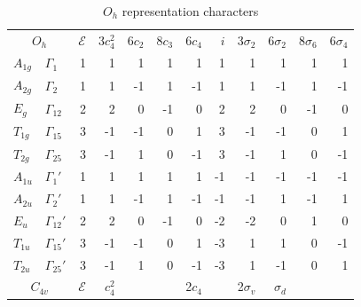 \documentclass[twocolumn,showpacs,preprintnumbers,superscriptaddress,prb,floatfix,aps,10pt]{revtex4-1}
\newcommand*{\id}{\mathcal{E}}
\begin{document}
%
%
%

\begin{table}
\caption{\label{table:chartab} $O_h$ representation characters}
\begin{ruledtabular}
\begin{tabular*}{10cm}{llrrrrrrrrrr}
\multicolumn{2}{c}{$O_h$}         &$\id$&3$c_4^2$& 6$c_2$ & 8$c_3$ & 6$c_4$ &  $i$ & 3$\sigma_2$ & 6$\sigma_2$ & 8$\sigma_6$ & 6$\sigma_4$ \\  
$A_{1g}$        & $\Gamma_{1}  $  &  1  &     1  &     1  &     1  &     1  &   1  &          1  &          1  &          1  &          1  \\         %
$A_{2g}$        & $\Gamma_{2}  $  &  1  &     1  &    -1  &     1  &    -1  &   1  &          1  &         -1  &          1  &         -1  \\         %
$E_g   $        & $\Gamma_{12} $  &  2  &     2  &     0  &    -1  &     0  &   2  &          2  &          0  &         -1  &          0  \\         %
$T_{1g}$        & $\Gamma_{15} $  &  3  &    -1  &    -1  &     0  &     1  &   3  &         -1  &         -1  &          0  &          1  \\         %
$T_{2g}$        & $\Gamma_{25} $  &  3  &    -1  &     1  &     0  &    -1  &   3  &         -1  &          1  &          0  &         -1  \\         %
$A_{1u}$        & $\Gamma_{1} '$  &  1  &     1  &     1  &     1  &     1  &  -1  &         -1  &         -1  &         -1  &         -1  \\         %
$A_{2u}$        & $\Gamma_{2} '$  &  1  &     1  &    -1  &     1  &    -1  &  -1  &         -1  &          1  &         -1  &          1  \\         %
$E_u   $        & $\Gamma_{12}'$  &  2  &     2  &     0  &    -1  &     0  &  -2  &         -2  &          0  &          1  &          0  \\         %
$T_{1u}$        & $\Gamma_{15}'$  &  3  &    -1  &    -1  &     0  &     1  &  -3  &          1  &          1  &          0  &         -1  \\         %
$T_{2u}$        & $\Gamma_{25}'$  &  3  &    -1  &     1  &     0  &    -1  &  -3  &          1  &         -1  &          0  &          1  \\ \hline  %
\multicolumn{2}{c}{$C_{4v}$}      &$\id$& $c_4^2$&        &        & 2$c_4$ &      & 2$\sigma_v$ &  $\sigma_d$ &             &             \\ 

\end{tabular*}
\end{ruledtabular}
\end{table}
\end{document}
